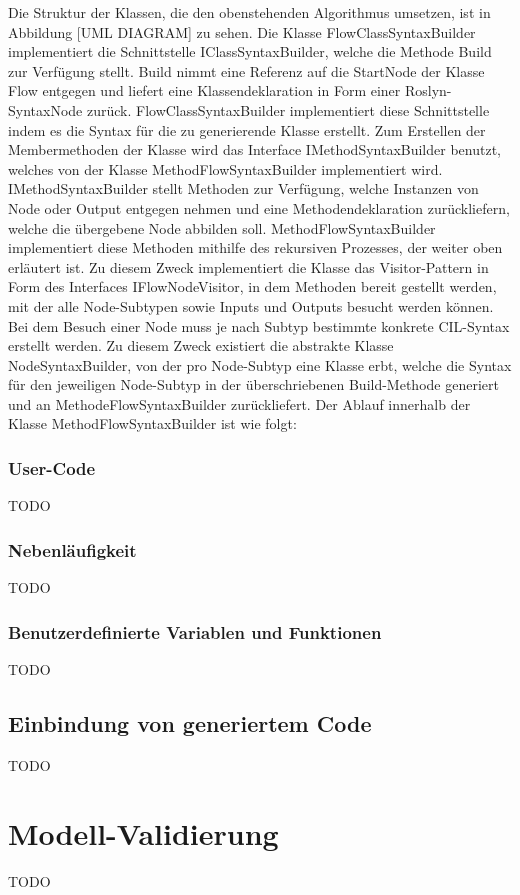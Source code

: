 Die Struktur der Klassen, die den obenstehenden Algorithmus umsetzen, ist in Abbildung [UML DIAGRAM] zu sehen. Die Klasse FlowClassSyntaxBuilder implementiert die Schnittstelle IClassSyntaxBuilder, welche die Methode Build zur Verfügung stellt. Build nimmt eine Referenz auf die StartNode der Klasse Flow entgegen und liefert eine Klassendeklaration in Form einer Roslyn-SyntaxNode zurück. FlowClassSyntaxBuilder implementiert diese Schnittstelle indem es die Syntax für die zu generierende Klasse erstellt. Zum Erstellen der Membermethoden der Klasse wird das Interface IMethodSyntaxBuilder benutzt, welches von der Klasse MethodFlowSyntaxBuilder implementiert wird. IMethodSyntaxBuilder stellt Methoden zur Verfügung, welche Instanzen von Node oder Output entgegen nehmen und eine Methodendeklaration zurückliefern, welche die übergebene Node abbilden soll. MethodFlowSyntaxBuilder implementiert diese Methoden mithilfe des rekursiven Prozesses, der weiter oben erläutert ist. Zu diesem Zweck implementiert die Klasse das Visitor-Pattern in Form des Interfaces IFlowNodeVisitor, in dem Methoden bereit gestellt werden, mit der alle Node-Subtypen sowie Inputs und Outputs besucht werden können. Bei dem Besuch einer Node muss je nach Subtyp bestimmte konkrete CIL-Syntax erstellt werden. Zu diesem Zweck existiert die abstrakte Klasse NodeSyntaxBuilder, von der pro Node-Subtyp eine Klasse erbt, welche die Syntax für den jeweiligen Node-Subtyp in der überschriebenen Build-Methode generiert und an MethodeFlowSyntaxBuilder zurückliefert. Der Ablauf innerhalb der Klasse MethodFlowSyntaxBuilder ist wie folgt: 

\subsubsection{User-Code}
TODO

\subsubsection{Nebenläufigkeit}
TODO

\subsubsection{Benutzerdefinierte Variablen und Funktionen}
TODO

\subsection{Einbindung von generiertem Code}
TODO

\section{Modell-Validierung} 
TODO